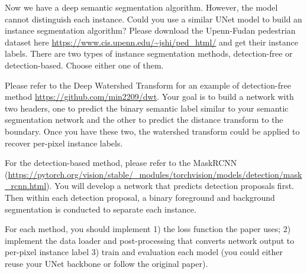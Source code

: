 \documentclass[11pt]{article}
\begin{document}
Now we have a deep semantic segmentation algorithm. However, the model cannot distinguish each instance. Could you use a similar UNet model to build an instance segmentation algorithm? Please download the Upenn-Fudan pedestrian dataset here \url{https://www.cis.upenn.edu/~jshi/ped_html/} and get their instance labels. There are two types of instance segmentation methods, detection-free or detection-based. Choose either one of them. 

Please refer to the Deep Watershed Transform for an example of detection-free method \url{https://github.com/min2209/dwt}. Your goal is to build a network with two headers, one to predict the binary semantic label similar to your semantic segmentation network and the other to predict the distance transform to the boundary. Once you have these two, the watershed transform could be applied to recover per-pixel instance labels.  

For the detection-based method, please refer to the MaskRCNN (\url{https://pytorch.org/vision/stable/_modules/torchvision/models/detection/mask_rcnn.html}). You will develop a network that predicts detection proposals first. Then within each detection proposal, a binary foreground and background segmentation is conducted to separate each instance. 

For each method, you should implement 1) the loss function the paper uses; 2) implement the data loader and post-processing that converts network output to per-pixel instance label 3) train and evaluation each model (you could either reuse your UNet backbone or follow the original paper). 
\end{document}
